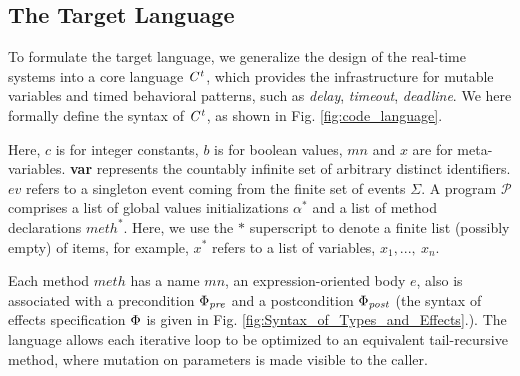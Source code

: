 \documentclass[acmsmall,10pt,review]{acmart}
\newcommand{\effect}{\textcolor{black}{\ensuremath{\mathrm{\Phi}}}}
\newcommand{\anyevent}[1]{{\textcolor{darkred}
{{\textbf{\footnotesize #1}}}}}
\newcommand{\code}[1]{{\tt{\ensuremath{\m{#1}}}}}
\newcommand{\m}{\mathit}
\newcommand\figref[1]{Fig. \textcolor{black}{\ref{#1}}.}
\newcommand{\timedL}{\code{C^{t}}}
\begin{document}
{\subsection{The Target Language}
\label{subsec:Targetlanguage}

To formulate the target language, we generalize the design of the real-time systems
 into a core language \code{\timedL}, 
 which provides the infrastructure for mutable variables and timed behavioral patterns, 
 such as \emph{delay}, \emph{timeout}, \emph{deadline}. 
We here formally define the syntax of \code{\timedL}, as shown in \figref{fig:code_language} 


Here, \code{c} is for integer constants, \code{b} is for boolean values, 
 \code{mn} and \code{x} are for meta-variables.  
 \textbf{var} represents the countably infinite set of arbitrary distinct identifiers. 
\code{ev} refers to a singleton event coming from the finite 
set of events \code{\Sigma}. 
A program \code{\mathcal{P}} comprises a list of 
global values initializations \code{\alpha^*} and 
a list of 
method declarations \code{{meth^*}}. 
Here, we use the \code{*} superscript to denote a finite list (possibly empty) of items, for example, \code{{x^*}} refers to a list of variables, \code{x_1, ...,\ x_n}. 


Each method \code{meth} has a name \code{mn}, an expression-oriented body \code{e}, also is associated with a precondition  \code{\effect_{pre}} and a postcondition \code{\effect_{post}} (the syntax of effects specification \code{\effect} is given in \figref{fig:Syntax_of_Types_and_Effects}).
The language allows each iterative loop to be optimized to an equivalent 
tail-recursive method, where mutation on parameters is made visible 
to the caller. 

}
\end{document}
